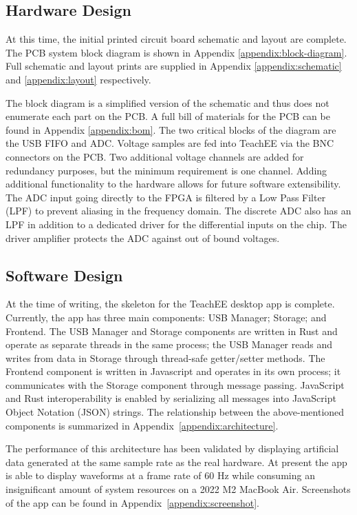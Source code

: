 \documentclass[letterpaper,12pt]{article}
\begin{document}
\subsection{Hardware Design}
At this time, the initial printed circuit board schematic and
layout are complete. The PCB system block diagram is shown in Appendix
\ref{appendix:block-diagram}. Full schematic and layout prints are supplied
in Appendix \ref{appendix:schematic} and \ref{appendix:layout} respectively.

The block diagram is a simplified version of the schematic and thus does
not enumerate each part on the PCB. A full bill of materials for the PCB can be
found in Appendix \ref{appendix:bom}. The two critical blocks of the diagram are
the USB FIFO and ADC. Voltage samples are fed into TeachEE via the BNC connectors
on the PCB. Two additional voltage channels are added for redundancy purposes,
but the minimum requirement is one channel. Adding additional functionality to
the hardware allows for future software extensibility. The
ADC input going directly to the FPGA is filtered by a Low Pass Filter (LPF) to
prevent aliasing in the frequency domain. The discrete ADC also has an LPF in
addition to a dedicated driver for the differential inputs on the chip. The
driver amplifier protects the ADC against out of bound voltages.

\subsection{Software Design}

At the time of writing, the skeleton for the TeachEE desktop app is complete.
Currently, the app has three main components: USB Manager; Storage;
and Frontend.  The USB Manager and Storage components are
written in Rust and operate as separate threads in the same process; the
USB Manager reads and writes from data in Storage through
thread-safe getter/setter methods. The Frontend component is written in
Javascript and operates in its own process; it communicates with the Storage
component through message passing. JavaScript and Rust interoperability is
enabled by serializing all messages into JavaScript Object Notation
(JSON) strings. The relationship between the above-mentioned components is
summarized in Appendix~\ref{appendix:architecture}.

The performance of this architecture has been validated by displaying artificial
data generated at the same sample rate as the real hardware. At present the app
is able to display waveforms at a frame rate of 60 Hz while consuming an
insignificant amount of system resources on a 2022 M2 MacBook Air. Screenshots
of the app can be found in Appendix~\ref{appendix:screenshot}.
\end{document}
